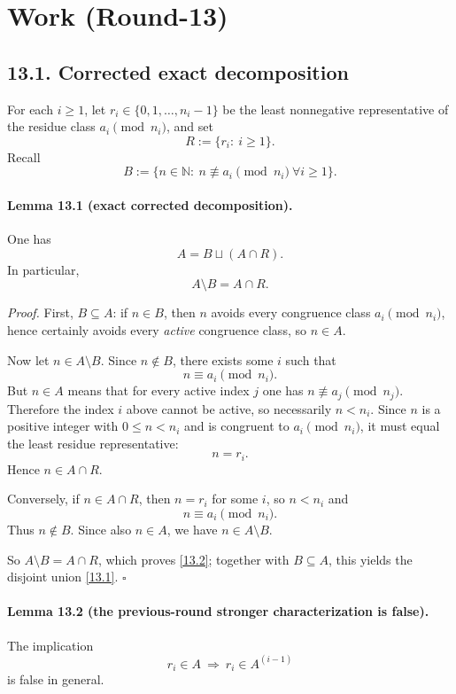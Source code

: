 \section{Work (Round-13)}
\subsection*{13.1. Corrected exact decomposition}
For each \(i\ge 1\), let \(r_i\in\{0,1,\dots,n_i-1\}\) be the least nonnegative representative of the residue class \(a_i\pmod{n_i}\), and set
\[
R:=\{r_i:\ i\ge 1\}.
\]
Recall
\[
B:=\{n\in\mathbb N:\ n\not\equiv a_i\pmod{n_i}\ \forall i\ge 1\}.
\]

\paragraph{Lemma 13.1 (exact corrected decomposition).}
One has
\begin{equation}
A=B\sqcup (A\cap R).
\tag{13.1}
\end{equation}
In particular,
\begin{equation}
A\setminus B=A\cap R.
\tag{13.2}
\end{equation}

\emph{Proof.}
First, \(B\subseteq A\): if \(n\in B\), then \(n\) avoids every congruence class \(a_i\pmod{n_i}\), hence certainly avoids every \emph{active} congruence class, so \(n\in A\).

Now let \(n\in A\setminus B\).  Since \(n\notin B\), there exists some \(i\) such that
\[
n\equiv a_i\pmod{n_i}.
\]
But \(n\in A\) means that for every active index \(j\) one has \(n\not\equiv a_j\pmod{n_j}\).  Therefore the index \(i\) above cannot be active, so necessarily \(n<n_i\).  Since \(n\) is a positive integer with \(0\le n<n_i\) and is congruent to \(a_i\pmod{n_i}\), it must equal the least residue representative:
\[
n=r_i.
\]
Hence \(n\in A\cap R\).

Conversely, if \(n\in A\cap R\), then \(n=r_i\) for some \(i\), so \(n<n_i\) and
\[
n\equiv a_i\pmod{n_i}.
\]
Thus \(n\notin B\).  Since also \(n\in A\), we have \(n\in A\setminus B\).

So \(A\setminus B=A\cap R\), which proves \eqref{13.2}; together with \(B\subseteq A\), this yields the disjoint union \eqref{13.1}. \hfill \(\square\)

\paragraph{Lemma 13.2 (the previous-round stronger characterization is false).}
The implication
\[
r_i\in A\ \Longrightarrow\ r_i\in A^{(i-1)}
\]
is false in general.

